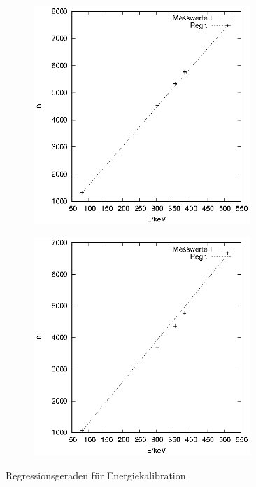 \begin{figure}[h]
  \centering
  \begin{subfigure}[h]{0.5\textwidth}
    \centering
    \includegraphics[width=0.9\textwidth]{data/Energiespektren/energiekal_links.eps}
    \label{fig:energiekal_links}
  \end{subfigure}%
  \begin{subfigure}[h]{0.5\textwidth}
    \centering
    \includegraphics[width=0.9\textwidth]{data/Energiespektren/energiekal_rechts.eps}
    \label{fig:energiekal_rechts}
  \end{subfigure}
  \caption{Regressionsgeraden für Energiekalibration}
  \label{fig:energiekal}
\end{figure}

